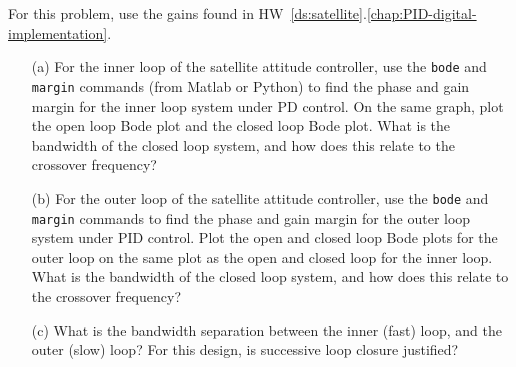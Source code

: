 
For this problem, use the gains found in HW~\ref{ds:satellite}.\ref{chap:PID-digital-implementation}.
\begin{itemize} \item[]
\item[(a)]  For the inner loop of the satellite attitude controller, use the \texttt{bode} and \texttt{margin} commands (from Matlab or Python) to find the phase and gain margin for the inner loop system under PD control.  On the same graph, plot the open loop Bode plot and the closed loop Bode plot. What is the bandwidth of the closed loop system, and how does this relate to the crossover frequency?

\item[(b)]  For the outer loop of the satellite attitude controller, use the  \texttt{bode} and \texttt{margin} commands to find the phase and gain margin for the outer loop system under PID control.  Plot the open and closed loop Bode plots for the outer loop on the same plot as the open and closed loop for the inner loop.  What is the bandwidth of the closed loop system, and how does this relate to the crossover frequency?

\item[(c)]  What is the bandwidth separation between the inner (fast) loop, and the outer (slow) loop?  For this design, is successive loop closure justified?
\end{itemize}
